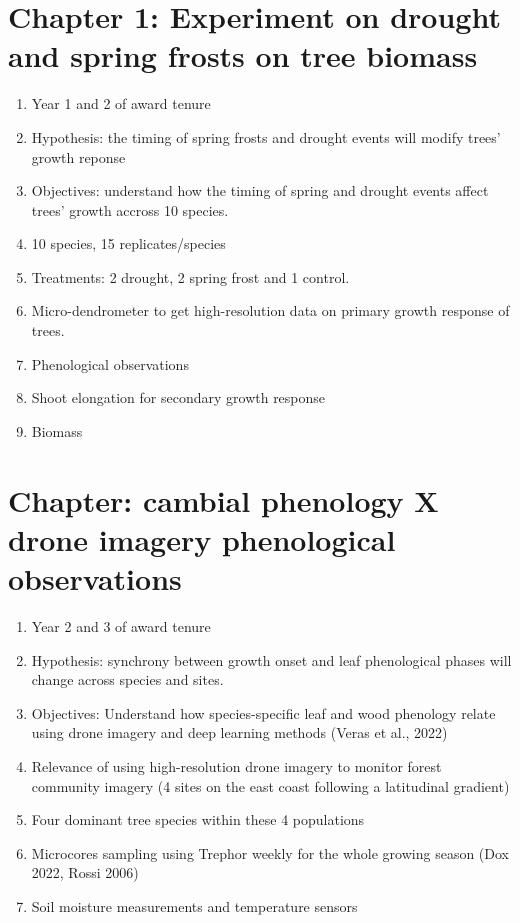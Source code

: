 \documentclass{article}
\begin{document}
\section*{Chapter 1: Experiment on drought and spring frosts on tree biomass}
\begin {enumerate}
	\item Year 1 and 2 of award tenure
	\item Hypothesis: the timing of spring frosts and drought events will modify trees' growth reponse 
	\item Objectives: understand how the timing of spring and drought events affect trees' growth accross 10 species. 
	\item 10 species, 15 replicates/species
	\item Treatments: 2 drought, 2 spring frost and 1 control. 
	\item Micro-dendrometer to get high-resolution data on primary growth response of trees.
	\item Phenological observations 
	\item Shoot elongation for secondary growth response
	\item Biomass
\end {enumerate}

\section*{Chapter: cambial phenology X drone imagery phenological observations}
\begin {enumerate}
	\item Year 2 and 3 of award tenure
	\item Hypothesis: synchrony between growth onset and leaf phenological phases will change across species and sites.
	\item Objectives: Understand how species-specific leaf and wood phenology relate using drone imagery and deep learning methods (Veras et al., 2022)
	\item Relevance of using high-resolution drone imagery to monitor forest community imagery (4 sites on the east coast following a latitudinal gradient) 
	\item Four dominant tree species within these 4 populations
	\item Microcores sampling using Trephor weekly for the whole growing season (Dox 2022, Rossi 2006)
	\item Soil moisture measurements and temperature sensors
\end {enumerate}
\end{document}
